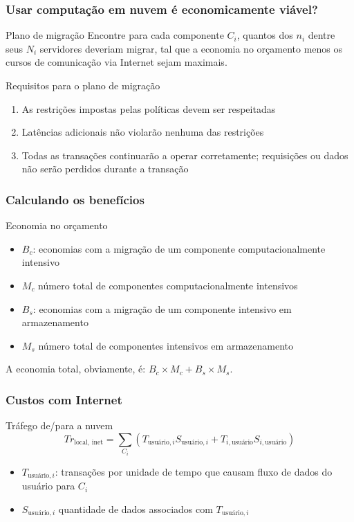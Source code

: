 \documentclass[Ligatures=TeX,table,brazil,svgnames,usetotalslideindicator,compress,10pt]{beamer}
\begin{document}
\begin{frame}
  \frametitle{Usar computação em nuvem é economicamente viável?}
  \begin{block}{Plano de migração}
    Encontre para cada componente $C_i$, quantos dos $n_i$ dentre seus $N_i$ servidores deveriam migrar, tal que a economia no orçamento menos os cursos de comunicação via Internet sejam maximais.
  \end{block}
  \begin{block}{Requisitos para o plano de migração}
    \begin{enumerate}
    \item As restrições impostas pelas políticas devem ser respeitadas
    \item Latências adicionais não violarão nenhuma das restrições
    \item Todas as transações continuarão a operar corretamente; requisições ou dados não serão perdidos durante a transação
    \end{enumerate}
  \end{block}
\end{frame}

\begin{frame}
  \frametitle{Calculando os benefícios}
  \begin{block}{Economia no orçamento}
    \begin{itemize}
    \item $B_c$: economias com a migração de um componente computacionalmente intensivo
    \item $M_c$ número total de componentes computacionalmente intensivos
    \item $B_s$: economias com a migração de um componente intensivo em armazenamento
    \item $M_s$ número total de componentes  intensivos em armazenamento
    \end{itemize}
    A economia total, obviamente, é: $B_c \times M_c + B_s \times M_s$.
  \end{block}
\end{frame}

\begin{frame}
  \frametitle{Custos com Internet}
  \begin{block}{Tráfego de/para a nuvem}
    \[Tr_{\text{local, inet}} = \sum_{C_i}
       ( T_{\text{usuário},i}S_{\text{usuário},i} + T_{i,\text{usuário}}S_{i,\text{usuário}} )\]
  \end{block}

    \begin{itemize}
    \item $T_{\text{usuário},i}$: transações por unidade de tempo que causam fluxo de dados do usuário para $C_i$
    \item $S_{\text{usuário},i}$ quantidade de dados associados com $T_{\text{usuário},i}$
    \end{itemize}
\end{frame}
\end{document}
